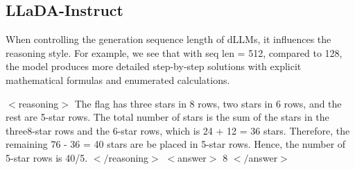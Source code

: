 \subsection{LLaDA-Instruct}
\label{appendix:qualitative-basellada}
When controlling the generation sequence length of dLLMs, it influences the reasoning style. For example, we see that with seq len = 512, compared to 128, the model produces more detailed step-by-step solutions with explicit mathematical formulas and enumerated calculations.

\begin{tcolorbox}[title=\textbf{Model:} LLaDA-8B-Instruct \\ 
\textbf{Generation Sequence Length:} 128 \\ \textbf{Question:} A 76-star flag has three rows of 8 stars\, two rows of 6 stars and the rest are 5-star rows. How many rows of 5 stars are there altogether on the flag?]
$<$reasoning$>$
The flag has three stars in 8 rows, two stars in 6 rows, and the rest are 5-star rows. The total number of stars is the sum of the stars in the three8-star rows and the 6-star rows, which is 24 + 12 = 36 stars. Therefore, the remaining 76 - 36 = 40 stars are be placed in 5-star rows. Hence, the number of 5-star rows is 40/5.
$</$reasoning$>$
$<$answer$>$
\textcolor{green!70!black}{\(\boxed{8}\)}
$</$answer$>$
\end{tcolorbox}


